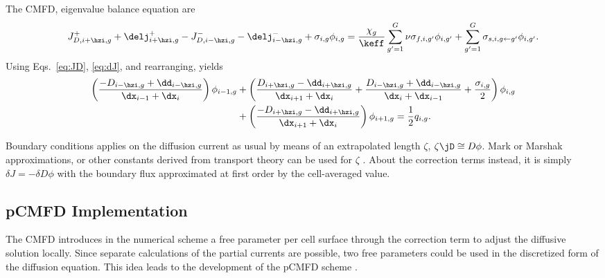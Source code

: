 The CMFD, eigenvalue balance equation are 
\begin{equation}
  \label{eq:CMFD-diff}
  J^+_{D,i+\hzi,g} + \delj^+_{i+\hzi,g} - J^-_{D,i-\hzi,g} - \delj^-_{i-\hzi,g} + \sigma_{i,g}\phi_{i,g}=
  \frac{\chi_g}{\keff}\sum\limits_{g'=1}^G\nu\sigma_{f,i,g'}\phi_{i,g'} + \sum\limits_{g'=1}^G\sigma_{s,i,g\leftarrow g'}\phi_{i,g'}. 
\end{equation}
Using Eqs.~\eqref{eq:JD}, \eqref{eq:dJ}, and rearranging, yields
\begin{equation}
  \label{eq:CMFD-diff-rearranged}
  \begin{split}
  \left( \frac{-D_{i-\hzi,g} + \dd_{i-\hzi,g}}{\dx_{i-1} + \dx_i}\right)\phi_{i-1,g}
  & + \left(\frac{D_{i+\hzi,g} - \dd_{i+\hzi,g}}{\dx_{i+1} + \dx_i} + \frac{D_{i-\hzi,g} + \dd_{i-\hzi,g}}{\dx_i + \dx_{i-1}} + \frac{\sigma_{i,g}}{2}\right) \phi_{i,g} \\
  & + \left( \frac{-D_{i+\hzi,g} - \dd_{i+\hzi,g}}{\dx_{i+1} + \dx_i} \right) \phi_{i+1,g} = \frac{1}{2}q_{i,g}.
  \end{split}
\end{equation}

Boundary conditions applies on the diffusion current as usual by means of an extrapolated length $\zeta$, $\zeta \jD \cong D \phi$. Mark or Marshak approximations, or other constants derived from transport theory can be used for $\zeta$ \cite{meghreblian1960reactor}. About the correction terms instead, it is simply $\delta J = -\delta D \phi$ with the boundary flux approximated at first order by the cell-averaged value.

\subsection{pCMFD Implementation}
\label{sec:RM-pCMFD}

The CMFD introduces in the numerical scheme a free parameter per cell surface through the correction term to adjust the diffusive solution locally. Since separate calculations of the partial currents are possible, two free parameters could be used in the discretized form of the diffusion equation. This idea leads to the development of the pCMFD scheme \cite{cho2003comparison}.

